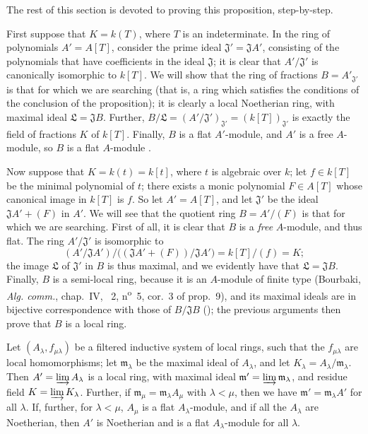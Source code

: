 The rest of this section is devoted to proving this proposition, step-by-step.
\begin{env}[10.3.1.1]
\label{0.10.3.1.1}
First suppose that $K=k(T)$, where $T$ is an indeterminate.
In the ring of polynomials $A'=A[T]$, consider the prime ideal $\mathfrak{J}'=\mathfrak{J}A'$, consisting of the
polynomials that have coefficients in the ideal $\mathfrak{J}$;
it is clear that $A'/\mathfrak{J}'$ is canonically isomorphic to $k[T]$.
We will show that the ring of fractions $B=A'_{\mathfrak{J}'}$ is that for which we are searching (that is, a ring which satisfies the conditions of the conclusion of the proposition);
it is clearly a local Noetherian ring, with maximal ideal $\mathfrak{L}=\mathfrak{J}B$.
Further, $B/\mathfrak{L}=(A'/\mathfrak{J}')_{\mathfrak{J}'}=(k[T])_{\mathfrak{J}'}$ is exactly the field of fractions $K$ of $k[T]$.
Finally, $B$ is a flat $A'$-module, and $A'$ is a free $A$-module, so $B$ is a flat $A$-module .
\end{env}

\begin{env}[10.3.1.2]
\label{0.10.3.1.2}
Now suppose that $K=k(t)=k[t]$, where $t$ is algebraic over $k$;
let $f\in k[T]$ be the minimal polynomial of $t$;
there exists a monic polynomial $F\in A[T]$ whose canonical image in $k[T]$ is $f$.
So let $A'=A[T]$, and let $\mathfrak{J}'$ be the ideal $\mathfrak{J}A'+(F)$ in $A'$.
We will see that the quotient ring $B=A'/(F)$ is that for which we are searching.
First of all, it is clear that $B$ is a \emph{free} $A$-module, and thus flat.
The ring $A'/\mathfrak{J}'$ is isomorphic to
\[
  (A'/\mathfrak{J}A')/\big((\mathfrak{J}A'+(F))/\mathfrak{J}A'\big)=k[T]/(f)=K;
\]
the image $\mathfrak{L}$ of $\mathfrak{J}'$ in $B$ is thus maximal, and we evidently have that $\mathfrak{L}=\mathfrak{J}B$.
Finally, $B$ is a semi-local ring, because it is an $A$-module of finite type (Bourbaki, \emph{Alg. comm.}, chap.~IV, \textsection~2, n\textsuperscript{o}~5, cor.~3 of prop.~9), and its maximal ideals are in bijective correspondence with those of $B/\mathfrak{J}B$ (\cite[vol.~I, p.~259]{I-13});
the previous arguments then prove that $B$ is a local ring.
\end{env}

\begin{lemma}[10.3.1.3]
\label{0.10.3.1.3}
Let $(A_\lambda,f_{\mu\lambda})$ be a filtered inductive system of local rings, such that the $f_{\mu\lambda}$ are local homomorphisms;
let $\mathfrak{m}_\lambda$ be the maximal ideal of $A_\lambda$, and let $K_\lambda=A_\lambda/\mathfrak{m}_\lambda$.
Then $A'=\varinjlim A_\lambda$ is a local ring, with maximal ideal $\mathfrak{m}'=\varinjlim\mathfrak{m}_\lambda$, and residue field $K=\varinjlim K_\lambda$.
Further, if $\mathfrak{m}_\mu=\mathfrak{m}_\lambda A_\mu$ with $\lambda<\mu$, then we have $\mathfrak{m}'=\mathfrak{m}_\lambda A'$ for all $\lambda$.
If, further, for $\lambda<\mu$, $A_\mu$ is a flat $A_\lambda$-module, and if all the $A_\lambda$ are Noetherian, then $A'$ is Noetherian and is a flat $A_\lambda$-module for all $\lambda$.
\end{lemma}

